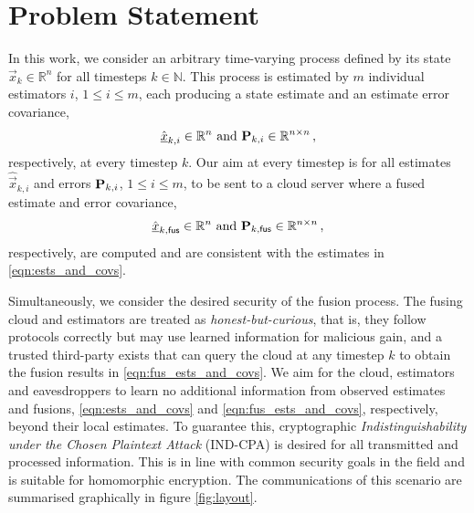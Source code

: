 \documentclass[letterpaper, 10 pt, conference]{ieeeconf}
\begin{document}
% 
%                                              
%                                              
%                                              
% 
\section{Problem Statement}\label{sec:problem}
In this work, we consider an arbitrary time-varying process defined by its state $\vec{x}_k \in \mathbb{R}^n$ for all timesteps $k \in \mathbb{N}$. This process is estimated by $m$ individual estimators $i$, $1\leq i\leq m$, each producing a state estimate and an estimate error covariance,
\begin{equation}\label{eqn:ests_and_covs}
    \hat{{\underline{x}}}_{k,i} \in \mathbb{R}^n \text{ and } {\ensuremath{{\mathbf{P}}}}_{k,i} \in \mathbb{R}^{n\times n}\,,
\end{equation}
respectively, at every timestep $k$. Our aim at every timestep is for all estimates $\hat{\vec{x}}_{k,i}$ and errors ${{\mathbf{P}}}_{k,i}$, $1\leq i\leq m$, to be sent to a cloud server where a fused estimate and error covariance,
\begin{equation}\label{eqn:fus_ests_and_covs}
    \hat{{\underline{x}}}_{k,\mathsf{fus}} \in \mathbb{R}^n \text{ and } {\ensuremath{{\mathbf{P}}}}_{k,\mathsf{fus}} \in \mathbb{R}^{n\times n}\,,
\end{equation}
respectively, are computed and are consistent with the estimates in \eqref{eqn:ests_and_covs}.

Simultaneously, we consider the desired security of the fusion process. The fusing cloud and estimators are treated as \textit{honest-but-curious}, that is, they follow protocols correctly but may use learned information for malicious gain, and a trusted third-party exists that can query the cloud at any timestep $k$ to obtain the fusion results in \eqref{eqn:fus_ests_and_covs}. We aim for the cloud, estimators and eavesdroppers to learn no additional information from observed estimates and fusions, \eqref{eqn:ests_and_covs} and \eqref{eqn:fus_ests_and_covs}, respectively, beyond their local estimates. To guarantee this, cryptographic \textit{Indistinguishability under the Chosen Plaintext Attack} (IND-CPA) \cite{katzIntroductionModernCryptography2008} is desired for all transmitted and processed information. This is in line with common security goals in the field and is suitable for homomorphic encryption. The communications of this scenario are summarised graphically in figure \ref{fig:layout}.
\end{document}
